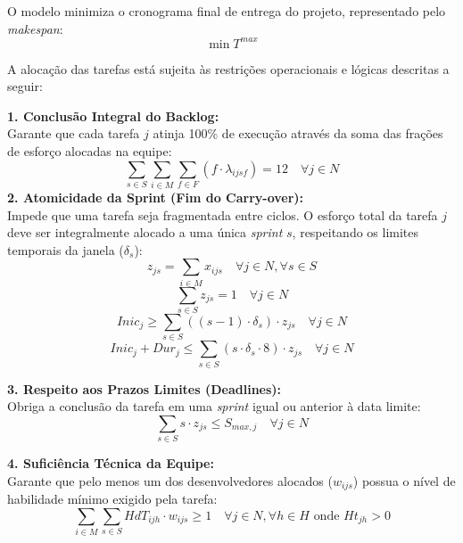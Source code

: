 \documentclass[a4paper,11pt]{article}
\begin{document}
O modelo minimiza o cronograma final de entrega do projeto, representado pelo
\textit{makespan}:
\begin{equation}
    \min T^{max}
\end{equation}

A alocação das tarefas está sujeita às restrições operacionais e lógicas 
descritas a seguir:

\vspace{0.2cm}
\noindent\textbf{1. Conclusão Integral do Backlog:} \\
Garante que cada tarefa $j$ atinja 100\% de execução através da soma das 
frações de esforço alocadas na equipe:
\begin{equation}
    \sum_{s \in S} \sum_{i \in M} \sum_{f \in F} (f \cdot \lambda_{ijsf}) = 12 \quad \forall j \in N
\end{equation}
\vspace{0.2cm}
\noindent\textbf{2. Atomicidade da Sprint (Fim do Carry-over):} \\
Impede que uma tarefa seja fragmentada entre ciclos. O esforço total da tarefa $j$ 
deve ser integralmente alocado a uma única \textit{sprint} $s$, respeitando os 
limites temporais da janela ($\delta_s$):
\begin{equation}
    z_{js} = \sum_{i \in M} x_{ijs} \quad \forall j \in N, \forall s \in S
\end{equation}
\begin{equation}
    \sum_{s \in S} z_{js} = 1 \quad \forall j \in N
\end{equation}
\begin{equation}
    Inic_{j} \ge \sum_{s \in S} ((s-1) \cdot \delta_s) \cdot z_{js} \quad \forall j \in N
\end{equation}
\begin{equation}
    Inic_{j} + Dur_{j} \le \sum_{s \in S} (s \cdot \delta_s \cdot 8) \cdot z_{js} \quad \forall j \in N
\end{equation}

\vspace{0.2cm}
\noindent\textbf{3. Respeito aos Prazos Limites (Deadlines):} \\
Obriga a conclusão da tarefa em uma \textit{sprint} igual ou anterior à data limite:
\begin{equation}
    \sum_{s \in S} s \cdot z_{js} \le S_{max, j} \quad \forall j \in N
\end{equation}

\vspace{0.2cm}
\noindent\textbf{4. Suficiência Técnica da Equipe:} \\
Garante que pelo menos um dos desenvolvedores alocados ($w_{ijs}$) possua o 
nível de habilidade mínimo exigido pela tarefa:
\begin{equation}
    \sum_{i \in M} \sum_{s \in S} HdT_{ijh} \cdot w_{ijs} \ge 1 \quad \forall j \in N, \forall h \in H \text{ onde } Ht_{jh} > 0
\end{equation}
\end{document}

